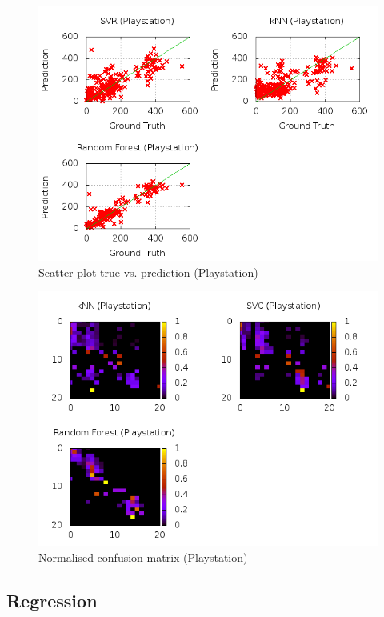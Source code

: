 \begin{figure}
\centering
\includegraphics[scale=0.55]{images/plots/machine_learning/playstation/true_pred_playstation.png}
\caption{Scatter plot true vs. prediction (Playstation)}
\label{true_predict_playstation}
\end{figure}
\begin{figure}
\centering
\includegraphics[scale=0.55]{images/plots/machine_learning/playstation/conf_mat_playstation.png}
\caption{Normalised confusion matrix (Playstation)}
\label{conf_mat_playstation}
\end{figure}
\subsection{Regression}
